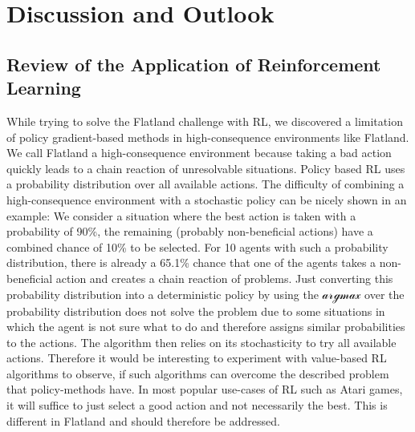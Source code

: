 %
%

\chapter{Discussion and Outlook}
\label{chap.diskussion}
\section{Review of the Application of Reinforcement Learning}\label{discussion_rl}
While trying to solve the Flatland challenge with RL, we discovered a limitation of policy gradient-based methods in high-consequence environments like Flatland.
We call Flatland a high-consequence environment because taking a bad action quickly leads to a chain reaction of unresolvable situations. Policy based RL uses a probability distribution over all available actions. The difficulty of combining a high-consequence environment with a stochastic policy can be nicely shown in an example: We consider a situation where the best action is taken with a probability of 90\%, the remaining (probably non-beneficial actions) have a combined chance of 10\% to be selected. For 10 agents with such a probability distribution, there is already a 65.1\% chance that one of the agents takes a non-beneficial action and creates a chain reaction of problems. Just converting this probability distribution into a deterministic policy by using the $\mathcal{argmax}$ over the probability distribution does not solve the problem due to some situations in which the agent is not sure what to do and therefore assigns similar probabilities to the actions. The algorithm then relies on its stochasticity to try all available actions. Therefore it would be interesting to experiment with value-based RL algorithms to observe, if such algorithms can overcome the described problem that policy-methods have. In most popular use-cases of RL such as Atari games, it will suffice to just select a good action and not necessarily the best. This is different in Flatland and should therefore be addressed.

